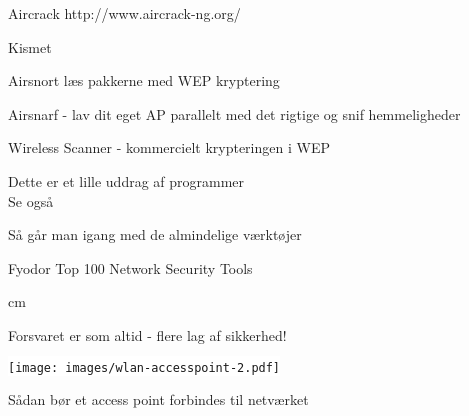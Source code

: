 \documentclass[Screen16to9,17pt]{foils}
\begin{document}
\begin{list2}
\item Aircrack {http://www.aircrack-ng.org/}
\item Kismet 
\item Airsnort  læs pakkerne med WEP
  kryptering
\item Airsnarf  - lav dit eget AP
  parallelt med det rigtige og snif hemmeligheder
\item Wireless Scanner  - kommercielt
  krypteringen i WEP
\item Dette er et lille uddrag af programmer\\
Se også 
\end{list2}


\begin{list1}
\item Så går man igang med de almindelige værktøjer
\item Fyodor Top 100 Network Security Tools 
\end{list1}
 cm

\centerline{\hlkbig Forsvaret er som altid - flere lag af sikkerhed! }


\begin{center}
\colorbox{white}{\texttt{[image: images/wlan-accesspoint-2.pdf]}}
\end{center}

\centerline{\hlkbig Sådan bør et access point forbindes til netværket}







\end{document}
